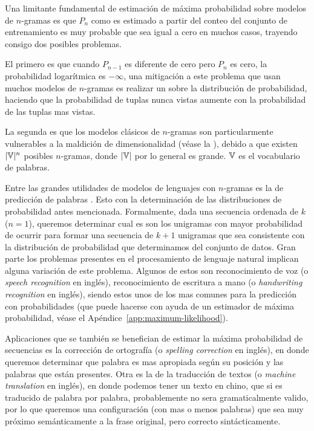 Una limitante fundamental de estimación de máxima probabilidad sobre modelos de $n$-gramas es que $P_n$ como es estimado a partir del conteo del conjunto de entrenamiento es muy probable que sea igual a cero en muchos casos, trayendo consigo dos posibles problemas.

El primero es que cuando $P_{n-1}$ es diferente de cero pero $P_n$ es cero, la probabilidad logarítmica es $-\infty$, una mitigación a este problema que usan muchos modelos de $n$-gramas es realizar un  sobre la distribución de probabilidad, haciendo que la probabilidad de tuplas nunca vistas aumente con la probabilidad de las tuplas mas vistas.

La segunda es que los modelos clásicos de $n$-gramas son particularmente vulnerables a la maldición de dimensionalidad (véase la ), debido a que existen $|{\mathbb{V}}|^n$ posibles $n$-gramas, donde $|{\mathbb{V}}|$ por lo general es grande. ${\mathbb{V}}$ es el vocabulario de palabras.

Entre las grandes utilidades de modelos de lenguajes con $n$-gramas es la de predicción de palabras \cite{jurafsky-martin}. Esto con la determinación de las distribuciones de probabilidad antes mencionada. Formalmente, dada una secuencia ordenada de $k$  ($n=1$), queremos determinar cual es son los unigramas con mayor probabilidad de ocurrir para formar una secuencia de $k+1$ unigramas que sea consistente con la distribución de probabilidad que determinamos del conjunto de datos. Gran parte los problemas presentes en el procesamiento de lenguaje natural implican alguna variación de este problema. Algunos de estos son reconocimiento de voz (o \textsl{speech recognition} en inglés), reconocimiento de escritura a mano (o \textsl{handwriting recognition} en inglés), siendo estos unos de los mas comunes para la predicción con probabilidades (que puede hacerse con ayuda de un estimador de máxima probabilidad, véase el Apéndice~\ref{app:maximum-likelihood}).

Aplicaciones que se también se benefician de estimar la máxima probabilidad de secuencias es la corrección de ortografía (o \textsl{spelling correction} en inglés), en donde queremos determinar que palabra es mas apropiada según su posición y las palabras que están presentes. Otra es la de la traducción de textos (o \textsl{machine translation} en inglés), en donde podemos tener un texto en chino, que si es traducido de palabra por palabra, probablemente no sera gramaticalmente valido, por lo que queremos una configuración (con mas o menos palabras) que sea muy próximo semánticamente a la frase original, pero correcto sintácticamente.


